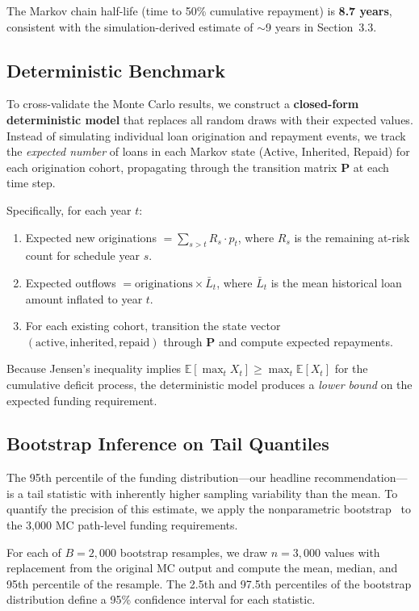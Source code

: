 \documentclass[11pt, letterpaper]{article}
\begin{document}
The Markov chain half-life (time to 50\% cumulative repayment) is \textbf{8.7 years}, consistent with the simulation-derived estimate of ${\sim}$9 years in Section~3.3.

\subsection{Deterministic Benchmark}

To cross-validate the Monte Carlo results, we construct a \textbf{closed-form deterministic model} that replaces all random draws with their expected values. Instead of simulating individual loan origination and repayment events, we track the \emph{expected number} of loans in each Markov state (Active, Inherited, Repaid) for each origination cohort, propagating through the transition matrix $\mathbf{P}$ at each time step.

Specifically, for each year $t$:
\begin{enumerate}[nosep]
  \item Expected new originations $= \sum_{s > t} R_s \cdot p_t$, where $R_s$ is the remaining at-risk count for schedule year $s$.
  \item Expected outflows $= \text{originations} \times \bar{L}_t$, where $\bar{L}_t$ is the mean historical loan amount inflated to year $t$.
  \item For each existing cohort, transition the state vector $(\text{active}, \text{inherited}, \text{repaid})$ through $\mathbf{P}$ and compute expected repayments.
\end{enumerate}

Because Jensen's inequality implies $\mathbb{E}[\max_t X_t] \geq \max_t \mathbb{E}[X_t]$ for the cumulative deficit process, the deterministic model produces a \emph{lower bound} on the expected funding requirement.

\subsection{Bootstrap Inference on Tail Quantiles}

The 95th percentile of the funding distribution---our headline recommendation---is a tail statistic with inherently higher sampling variability than the mean. To quantify the precision of this estimate, we apply the nonparametric bootstrap~\cite{efron1979,efron1993} to the 3{,}000 MC path-level funding requirements.

For each of $B = 2{,}000$ bootstrap resamples, we draw $n = 3{,}000$ values with replacement from the original MC output and compute the mean, median, and 95th percentile of the resample. The 2.5th and 97.5th percentiles of the bootstrap distribution define a 95\% confidence interval for each statistic.
\end{document}
